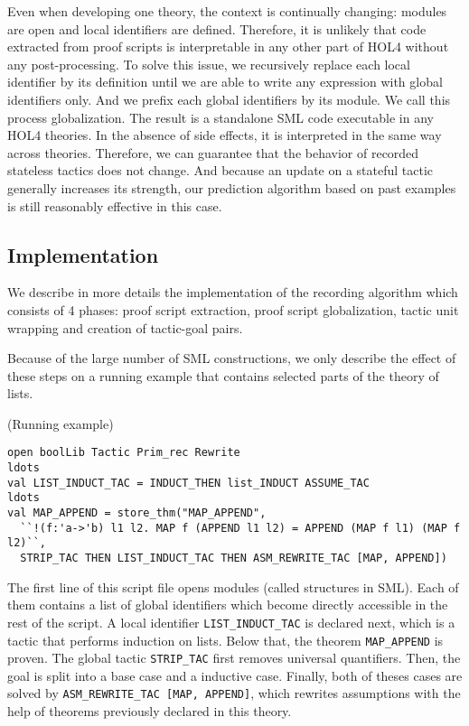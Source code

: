 \documentclass[runningheads,a4paper,draft]{svjour3}
\def\holfour{\textsf{HOL4}\xspace}
\def\sml{\textsf{SML}\xspace}
\begin{document}
Even when developing one theory, the context is continually changing:
modules are open and local identifiers are defined. Therefore, it is unlikely
that code extracted from proof scripts is interpretable in any other part of
\holfour without any post-processing.
To solve this issue, we recursively replace each local identifier by its
definition until we are able to write any expression with global identifiers
only. And we prefix each global identifiers by its module.
We call this process globalization. The result is a standalone \sml code
executable in any \holfour theories.  In the absence of side effects, it is
interpreted in the same way across theories.
Therefore, we can guarantee that the behavior of recorded stateless tactics
does not change. And because an update on a stateful tactic
generally increases its strength, our prediction algorithm based on past
examples is still reasonably effective in this case.

\subsection{Implementation}
We describe in more details the implementation of the recording algorithm which
consists of 4 phases: proof script extraction, proof script globalization,
tactic unit wrapping and creation of tactic-goal pairs.

Because of the large number of \sml constructions, we only describe the effect
of these steps on a running example that contains selected parts of the theory
of lists.


\begin{example}\label{ex:running}(Running example)
\small
\begin{lstlisting}[language=SMLSmall]
open boolLib Tactic Prim_rec Rewrite
ldots
val LIST_INDUCT_TAC = INDUCT_THEN list_INDUCT ASSUME_TAC
ldots
val MAP_APPEND = store_thm("MAP_APPEND",
  ``!(f:'a->'b) l1 l2. MAP f (APPEND l1 l2) = APPEND (MAP f l1) (MAP f l2)``,
  STRIP_TAC THEN LIST_INDUCT_TAC THEN ASM_REWRITE_TAC [MAP, APPEND])
\end{lstlisting}
\end{example}

The first line of this script file opens modules (called structures in \sml). Each of
them contains a list of global identifiers which become directly accessible in
the rest of the script.
A local identifier \texttt{LIST\_INDUCT\_TAC} is declared next, which is a
tactic that performs induction on lists. Below that, the theorem
\texttt{MAP\_APPEND} is proven.
The global tactic \texttt{STRIP\_TAC} first removes universal quantifiers. Then,
the goal is split into a base case and a inductive case. Finally, both of
theses cases are solved by \texttt{ASM\_REWRITE\_TAC [MAP, APPEND]}, which
rewrites assumptions with the help of theorems previously declared in this
theory.
\end{document}
